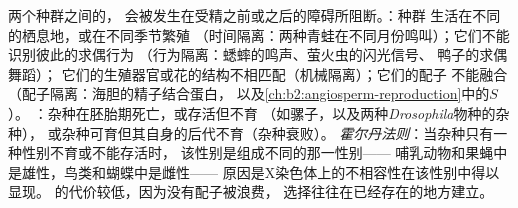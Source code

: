 \begin{proposition}[隔离机制]\label{prop:b2:speciation:isolation}
两个种群之间的，
会被发生在受精之前或之后的障碍所阻断。\emph{}：种群
生活在不同的栖息地，或在不同季节繁殖
（时间隔离：两种青蛙在不同月份鸣叫）；它们不能识别彼此的求偶行为
（行为隔离：蟋蟀的鸣声、萤火虫的闪光信号、
鸭子的求偶舞蹈）；
它们的生殖器官或花的结构不相匹配（机械隔离）；它们的配子
不能融合（配子隔离：海胆的精子结合蛋白，
以及\cref{ch:b2:angiosperm-reproduction}中的$S$）。
\emph{}：杂种在胚胎期死亡，或存活但不育
（如骡子，以及两种\emph{Drosophila}物种的杂种），
或杂种可育但其自身的后代不育（杂种衰败）。
\emph{霍尔丹法则}：当杂种只有一种性别不育或不能存活时，
该性别是组成不同的那一性别——
哺乳动物和果蝇中是雄性，鸟类和蝴蝶中是雌性——
原因是X染色体上的不相容性在该性别中得以显现。
的代价较低，因为没有配子被浪费，
选择往往在已经存在的地方建立。
\end{proposition}

